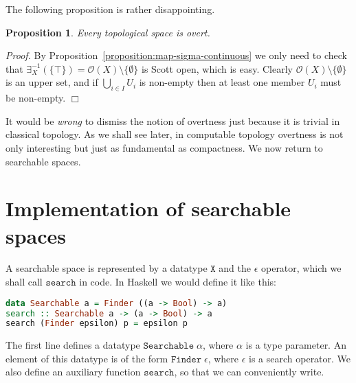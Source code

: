 \documentclass[a4paper,10pt]{article}
\newtheorem{proposition}[theorem]{Proposition}
\newenvironment{proof}{\par\noindent\textit{Proof.}}{\hfill$\Box$\par\medskip}
\newcommand{\set}[1]{\{#1\}}
\newcommand{\tpl}[1]{\mathcal{O}(#1)}
\begin{document}
The following proposition is rather disappointing.

\begin{proposition}
  Every topological space is overt.
\end{proposition}

\begin{proof}
  By Proposition~\ref{proposition:map-sigma-continuous} we only need
  to check that $\exists_X^{-1}(\set{\top}) = \tpl{X} \setminus
  \set{\emptyset}$ is Scott open, which is easy. Clearly $\tpl{X} \setminus
  \set{\emptyset}$ is an upper set, and if $\bigcup_{i \in I} U_i$ is
  non-empty then at least one member $U_i$ must be non-empty.
\end{proof}

It would be \emph{wrong} to dismiss the notion of overtness just
because it is trivial in classical topology. As we shall see later,
in computable topology overtness is not only interesting but just as
fundamental as compactness. We now return to searchable spaces.


\section{Implementation of searchable spaces}
\label{sec:implementation-searchable}

A searchable space is represented by a datatype $\mathtt{X}$ and the
$\epsilon$ operator, which we shall call $\mathtt{search}$ in code. In
Haskell we would define it like this:
%
\begin{lstlisting}[language=Haskell]
data Searchable a = Finder ((a -> Bool) -> a)
search :: Searchable a -> (a -> Bool) -> a
search (Finder epsilon) p = epsilon p
\end{lstlisting}
%
The first line defines a datatype $\mathtt{Searchable}\;\alpha$, where
$\alpha$ is a type parameter. An element of this datatype is of the
form $\mathtt{Finder}\;\epsilon$, where $\epsilon$ is a search
operator. We also define an auxiliary function $\mathtt{search}$, so
that we can conveniently write.
\end{document}
